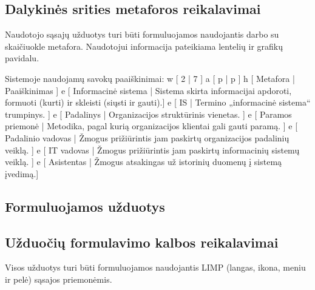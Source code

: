 \subsection{Dalykinės srities metaforos reikalavimai}
{
  Naudotojo sąsajų užduotys turi būti formuluojamos naudojantis darbo
  su skaičiuokle metafora. Naudotojui informacija pateikiama lentelių
  ir grafikų pavidalu.

  Sistemoje naudojamų savokų paaiškinimai:
  \xtable
  {
    w [ 2 | 7 ]
    a [ p | p ]
    h [ Metafora | Paaiškinimas ]
    e [ Informacinė sistema |
      Sistema skirta informacijai apdoroti, formuoti (kurti) ir skleisti
      (siųsti ir gauti).]
    e [ IS | Termino „informacinė sistema“ trumpinys. ]
    e [ Padalinys | Organizacijos struktūrinis vienetas. ]
    e [ Paramos priemonė |
      Metodika, pagal kurią organizacijos klientai gali gauti paramą. ]
    e [ Padalinio vadovas |
      Žmogus prižiūrintis jam paskirtų organizacijos padalinių veiklą. ]
    e [ IT vadovas |
      Žmogus prižiūrintis jam paskirtų informacinių sistemų veiklą. ]
    e [ Asistentas |
      Žmogus atsakingas už istorinių duomenų į sistemą įvedimą.]
  }
}

\subsection{Formuluojamos užduotys}

\subsection{Užduočių formulavimo kalbos reikalavimai}
{Visos užduotys turi būti formuluojamos naudojantis LIMP (langas, ikona,
meniu ir pelė) sąsajos priemonėmis.}

